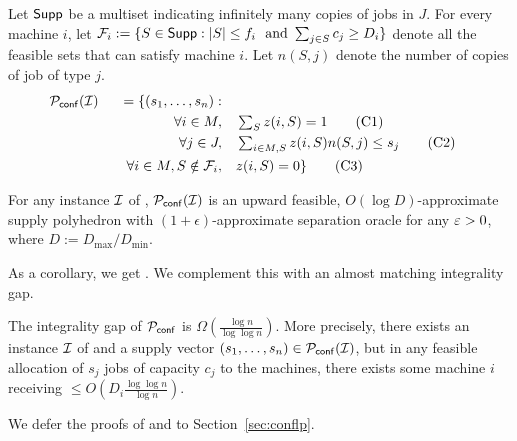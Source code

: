 Let $\mathsf{Supp}$ be a multiset indicating infinitely many copies of jobs in $J$.
For every machine $i$, let ${\cal F}_i :=\{S\in \mathsf{Supp}: |S| \leq f_i ~\textrm{ and } \sum_{j\in S} c_j \geq D_i\}$ denote all the feasible sets that can satisfy machine $i$. 
Let $n(S,j)$ denote the number of copies of job of type $j$.
\begin{alignat}{4}
	{\cal P}_\mathsf{conf}({\cal I}) && = \{(s_1,\ldots,s_n):  && \notag \\
	&& \quad \forall i \in M,   &\quad  \textstyle \sum_{S} z(i,S)  =  1 \label{eq:conflp1} \tag{C1} \\
	&& \quad \forall j\in J ,  &\quad  \textstyle \sum_{i\in M,S}  z(i,S)n(S,j) \le  s_j \label{eq:conflp2}\tag{C2} \\
	&& \quad \forall i\in M, S\notin {\cal F}_i, & \quad z(i,S)  = 0 \label{eq:conflp3} \} \tag{C3}
\end{alignat}
\begin{theorem}\label{thm:conflp}
	For any instance ${\cal I}$ of \cckp, ${\cal P}_\mathsf{conf}({\cal I})$ is an upward feasible, $O(\log D)$-approximate supply polyhedron with $(1+\epsilon)$-approximate separation oracle for any $\varepsilon > 0$, 
	where $D := D_{\mathrm{max}}/D_\mathrm{min}$.
\end{theorem}
\noindent
As a corollary, we get  .
We complement this with an almost matching integrality gap.
\begin{theorem}
	\label{thm:conf-ig}
	The integrality gap of ${\cal P}_\mathsf{conf}$ is $\Omega\left(\frac{\log n}{\log\log n}\right)$. More precisely, there exists an instance ${\cal I}$ of \cckp and a supply vector $(s_1,\ldots,s_n) \in {\cal P}_\mathsf{conf}({\cal I})$, but in any feasible allocation of $s_j$ jobs of capacity $c_j$ to the machines, there exists some machine  $i$ receiving $\leq O\left( D_i\frac{\log\log n}{\log n}\right)$.
\end{theorem}
We defer the proofs of  and  to Section~\ref{sec:conflp}.
